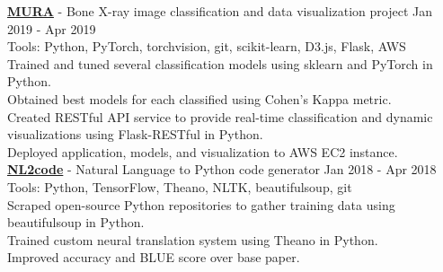 \documentclass[a4paper]{article}
\newcommand{\mybullet}{
	\indent 
  \textbullet \hspace*{2mm}
}
\begin{document}
      \noindent
      \textbf{\href{http://ec2-3-212-216-62.compute-1.amazonaws.com/}{MURA}} - Bone X-ray image 
      classification and data visualization project \hfill Jan 2019 - Apr 2019 \\
      Tools: Python, PyTorch, torchvision, git, scikit-learn, D3.js, Flask, AWS \\
      \mybullet Trained and tuned several classification models using sklearn and PyTorch in Python. \\
      \mybullet Obtained best models for each classified using Cohen's Kappa metric. \\
      \mybullet Created RESTful API service to provide real-time classification and dynamic visualizations
      using Flask-RESTful in Python. \\
      \mybullet Deployed application, models, and visualization to AWS EC2 instance. \\

			\noindent
      \textbf{\href{https://github.com/darkestfloyd/NL2code}{NL2code}} - Natural Language to 
      Python code generator \hfill Jan 2018 - Apr 2018 \\
      Tools: Python, TensorFlow, Theano, NLTK, beautifulsoup, git \\
      \mybullet Scraped open-source Python repositories to gather training data 
      using beautifulsoup in Python. \\
      \mybullet Trained custom neural translation system using Theano in Python. \\
      \mybullet Improved accuracy and BLUE score over base paper. \\
\end{document}

